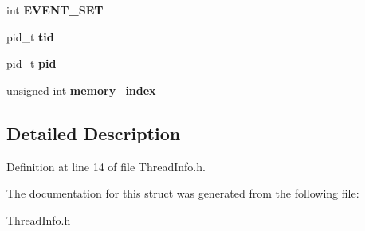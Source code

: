 \begin{DoxyCompactItemize}
\item 
\hypertarget{structthread__info_a21c57b3b3441bb52f7f8608cfb2e5db3}{int {\bfseries E\-V\-E\-N\-T\-\_\-\-S\-E\-T}}\label{structthread__info_a21c57b3b3441bb52f7f8608cfb2e5db3}

\item 
\hypertarget{structthread__info_a9ffe0e56ec9e7525cf6cb1833d79429b}{pid\-\_\-t {\bfseries tid}}\label{structthread__info_a9ffe0e56ec9e7525cf6cb1833d79429b}

\item 
\hypertarget{structthread__info_a34abfb7632807b7d3a61ed3a68e7f896}{pid\-\_\-t {\bfseries pid}}\label{structthread__info_a34abfb7632807b7d3a61ed3a68e7f896}

\item 
\hypertarget{structthread__info_acfedadd4c596089d7b4cb12f5729b8b1}{unsigned int {\bfseries memory\-\_\-index}}\label{structthread__info_acfedadd4c596089d7b4cb12f5729b8b1}

\end{DoxyCompactItemize}


\subsection{Detailed Description}


Definition at line 14 of file Thread\-Info.\-h.



The documentation for this struct was generated from the following file\-:\begin{DoxyCompactItemize}
\item 
Thread\-Info.\-h\end{DoxyCompactItemize}
